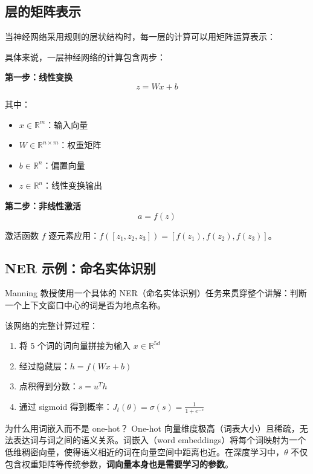 \documentclass[a4paper]{article}
\begin{document}
\subsection{层的矩阵表示}

当神经网络采用规则的层状结构时，每一层的计算可以用矩阵运算表示：





具体来说，一层神经网络的计算包含两步：

\textbf{第一步：线性变换}
$$z = Wx + b$$

其中：
\begin{itemize}
    \item $x \in \mathbb{R}^m$：输入向量
    \item $W \in \mathbb{R}^{n \times m}$：权重矩阵
    \item $b \in \mathbb{R}^n$：偏置向量
    \item $z \in \mathbb{R}^n$：线性变换输出
\end{itemize}

\textbf{第二步：非线性激活}
$$a = f(z)$$

激活函数 $f$ 逐元素应用：$f([z_1, z_2, z_3]) = [f(z_1), f(z_2), f(z_3)]$。

\subsection{NER 示例：命名实体识别}

Manning 教授使用一个具体的 NER（命名实体识别）任务来贯穿整个讲解：判断一个上下文窗口中心的词是否为地点名称。





该网络的完整计算过程：
\begin{enumerate}
    \item 将 5 个词的词向量拼接为输入 $x \in \mathbb{R}^{5d}$
    \item 经过隐藏层：$h = f(Wx + b)$
    \item 点积得到分数：$s = u^T h$
    \item 通过 sigmoid 得到概率：$J_t(\theta) = \sigma(s) = \frac{1}{1 + e^{-s}}$
\end{enumerate}

\begin{knowledgebox}{为什么用词嵌入而不是 one-hot？}
One-hot 向量维度极高（词表大小）且稀疏，无法表达词与词之间的语义关系。词嵌入（word embeddings）将每个词映射为一个低维稠密向量，使得语义相近的词在向量空间中距离也近。在深度学习中，$\theta$ 不仅包含权重矩阵等传统参数，\textbf{词向量本身也是需要学习的参数}。
\end{knowledgebox}
\end{document}
